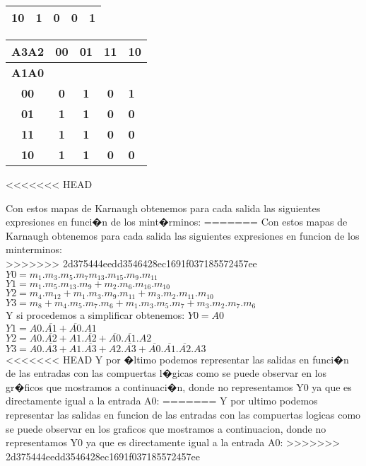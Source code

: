 \begin{table}[htb]
\begin{tabular}{|c|c|c|c|l|}
\textbf{10}   & \textbf{1}  & \textbf{0}  & \textbf{0}  & \textbf{1}  \\ \hline
\end{tabular}
\begin{tabular}{|c|c|c|c|l|}
\hline
\textbf{A3A2} & \textbf{00} & \textbf{01} & \textbf{11} & \textbf{10} \\ \hline
\textbf{A1A0} & \multicolumn{4}{c|}{\textbf{}}                        \\ \hline
\textbf{00}   & \textbf{0}  & \textbf{1}  & \textbf{0}  & \textbf{1}  \\ \hline
\textbf{01}   & \textbf{1}  & \textbf{1}  & \textbf{0}  & \textbf{0}  \\ \hline
\textbf{11}   & \textbf{1}  & \textbf{1}  & \textbf{0}  & \textbf{0}  \\ \hline
\textbf{10}   & \textbf{1}  & \textbf{1}  & \textbf{0}  & \textbf{0}  \\ \hline
\end{tabular}
\end{table}

<<<<<<< HEAD



Con estos mapas de Karnaugh obtenemos para cada salida las siguientes expresiones en funci�n de los mint�rminos:
=======
Con estos mapas de Karnaugh obtenemos para cada salida las siguientes expresiones en funcion de los minterminos: \\
>>>>>>> 2d375444eedd3546428ec1691f037185572457ee
$Y0 = m_1 . m_3 . m_5 . m_7 m_{13} . m_{15} . m_9 . m_{11}$ \\
$Y1 = m_1 . m_5 . m_{13} . m_9 + m_2 . m_6 . m_{16} . m_{10}$ \\
$Y2 = m_4 . m_{12} + m_1 . m_3 . m_9 . m_{11} + m_3 . m_2 . m_{11} . m_{10}$\\
$Y3 = m_8 + m_4 . m_5 . m_7 . m_6 + m_1 . m_3 . m_5 . m_7 + m_3 . m_2 . m_7 . m_6$\\
Y si procedemos a simplificar obtenemos:
$Y0 = A0$\\
$Y1 = A0 . \overline{A1} + \overline{A0} . A1$\\
$Y2 = A0 . \overline{A2} + A1 . \overline{A2} + \overline{A0} . \overline{A1} . A2$\\
$Y3 = A0 . \overline{A3} + A1 . \overline{A3} + A2 . \overline{A3} + \overline{A0} . \overline{A1} . \overline{A2} . A3$\\
<<<<<<< HEAD
Y por �ltimo podemos representar las salidas en funci�n de las entradas con las compuertas l�gicas como se puede observar en los gr�ficos que mostramos a continuaci�n, donde no representamos Y0 ya que es directamente igual a la entrada A0:
=======
Y por ultimo podemos representar las salidas en funcion de las entradas con las compuertas logicas como se puede observar en los graficos que mostramos a continuacion, donde no representamos Y0 ya que es directamente igual a la entrada A0:
>>>>>>> 2d375444eedd3546428ec1691f037185572457ee

